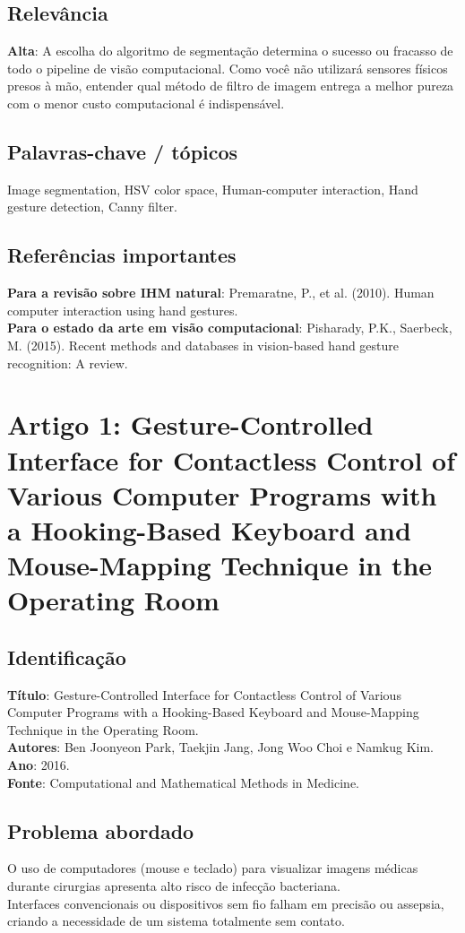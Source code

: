 \documentclass[12pt, a4paper]{article}
\begin{document}
\subsection{Relevância}
\textbf{Alta}: A escolha do algoritmo de segmentação determina o sucesso ou fracasso de todo o pipeline de visão computacional. Como você não utilizará sensores físicos presos à mão, entender qual método de filtro de imagem entrega a melhor pureza com o menor custo computacional é indispensável.\\
\subsection{Palavras-chave / tópicos}
Image segmentation, HSV color space, Human-computer interaction, Hand gesture detection, Canny filter.\\
\subsection{Referências importantes}
\textbf{Para a revisão sobre IHM natural}: Premaratne, P., et al. (2010). Human computer interaction using hand gestures.\\
\textbf{Para o estado da arte em visão computacional}: Pisharady, P.K., Saerbeck, M. (2015). Recent methods and databases in vision-based hand gesture recognition: A review.\\
\newpage
\section{Artigo 1: Gesture-Controlled Interface for Contactless Control of Various Computer Programs with a Hooking-Based Keyboard and Mouse-Mapping Technique in the Operating Room}
\subsection{Identificação}
\textbf{Título}: Gesture-Controlled Interface for Contactless Control of Various Computer Programs with a Hooking-Based Keyboard and Mouse-Mapping Technique in the Operating Room.\\
\textbf{Autores}: Ben Joonyeon Park, Taekjin Jang, Jong Woo Choi e Namkug Kim.\\
\textbf{Ano}: 2016.\\
\textbf{Fonte}: Computational and Mathematical Methods in Medicine.\\
\subsection{Problema abordado}
O uso de computadores (mouse e teclado) para visualizar imagens médicas durante cirurgias apresenta alto risco de infecção bacteriana.\\
Interfaces convencionais ou dispositivos sem fio falham em precisão ou assepsia, criando a necessidade de um sistema totalmente sem contato.\\
\end{document}
